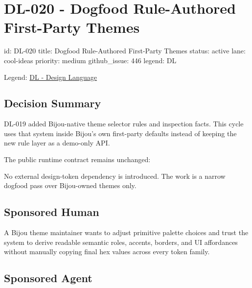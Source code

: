 \chapter{DL-020 - Dogfood Rule-Authored First-Party Themes}\label{record-185}

\smallskip

\begin{RecordMeta}
id: DL-020
title: Dogfood Rule-Authored First-Party Themes
status: active
lane: cool-ideas
priority: medium
github_issue: 446
legend: DL

\end{RecordMeta}

Legend: \href{https://github.com/flyingrobots/bijou/blob/1853ad902f6bf219326409e7f743a5a1d6517dbc/docs/legends/DL-design-language.md}{DL - Design Language}

\section{Decision Summary}\label{record-185-decision-summary}

DL-019 added Bijou-native theme selector rules and inspection facts. This cycle uses that system inside Bijou's own first-party defaults instead of keeping the new rule layer as a demo-only API.

The public runtime contract remains unchanged:



No external design-token dependency is introduced. The work is a narrow dogfood pass over Bijou-owned themes only.

\section{Sponsored Human}\label{record-185-sponsored-human}

A Bijou theme maintainer wants to adjust primitive palette choices and trust the system to derive readable semantic roles, accents, borders, and UI affordances without manually copying final hex values across every token family.

\section{Sponsored Agent}\label{record-185-sponsored-agent}

